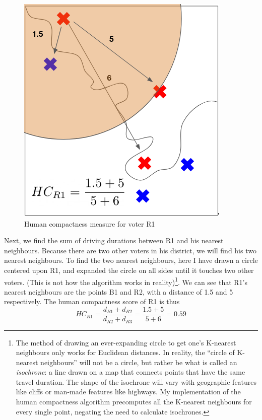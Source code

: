 \documentclass[]{article}
\begin{document}
\begin{figure}
\centering
\includegraphics{img/human_compactness_2a.png}
\caption{Human compactness measure for voter R1 \label{hc_r1}}
\end{figure}

Next, we find the sum of driving durations between R1 and his nearest
neighbours. Because there are two other voters in his district, we will
find his two nearest neighbours. To find the two nearest neighbours,
here I have drawn a circle centered upon R1, and expanded the circle on
all sides until it touches two other voters. (This is not how the
algorithm works in reality)\footnote{The method of drawing an
  ever-expanding circle to get one's K-nearest neighbours only works for
  Euclidean distances. In reality, the ``circle of K-nearest
  neighbours'' will not be a circle, but rather be what is called an
  \emph{isochrone}: a line drawn on a map that connects points that have
  the same travel duration. The shape of the isochrone will vary with
  geographic features like cliffs or man-made features like highways. My
  implementation of the human compactness algorithm precomputes all the
  K-nearest neighbours for every single point, negating the need to
  calculate isochrones.}. We can see that R1's nearest neighbours are
the points B1 and R2, with a distance of 1.5 and 5 respectively. The
human compactness score of R1 is thus
\[HC_{R1} = \frac{d_{B1}+d_{R2}}{d_{R2} + d_{R3}} = \frac{1.5 +
5}{5+6} = 0.59\]
\end{document}
